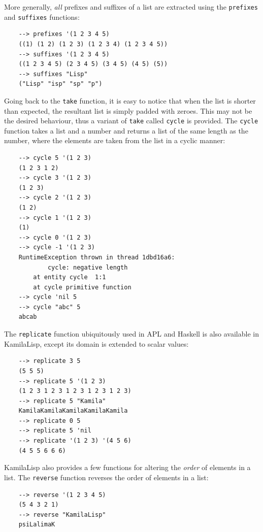More generally, \textit{all} prefixes and suffixes of a list are extracted using the \verb|prefixes| and \verb|suffixes| functions:

\begin{Verbatim}
    --> prefixes '(1 2 3 4 5)
    ((1) (1 2) (1 2 3) (1 2 3 4) (1 2 3 4 5))
    --> suffixes '(1 2 3 4 5)
    ((1 2 3 4 5) (2 3 4 5) (3 4 5) (4 5) (5))
    --> suffixes "Lisp"
    ("Lisp" "isp" "sp" "p")
\end{Verbatim}

Going back to the \verb|take| function, it is easy to notice that when the list is shorter than expected, the resultant list is simply padded with zeroes. This may not be the desired behaviour, thus a variant of \verb|take| called \verb|cycle| is provided. The \verb|cycle| function takes a list and a number and returns a list of the same length as the number, where the elements are taken from the list in a cyclic manner:

\begin{Verbatim}
    --> cycle 5 '(1 2 3)
    (1 2 3 1 2)
    --> cycle 3 '(1 2 3)
    (1 2 3)
    --> cycle 2 '(1 2 3)
    (1 2)
    --> cycle 1 '(1 2 3)
    (1)
    --> cycle 0 '(1 2 3)
    --> cycle -1 '(1 2 3)
    RuntimeException thrown in thread 1dbd16a6:
            cycle: negative length
        at entity cycle  1:1
        at cycle primitive function
    --> cycle 'nil 5
    --> cycle "abc" 5
    abcab
\end{Verbatim}

The \verb|replicate| function ubiquitously used in APL and Haskell is also available in KamilaLisp, except its domain is extended to scalar values:

\begin{Verbatim}
    --> replicate 3 5
    (5 5 5)
    --> replicate 5 '(1 2 3)
    (1 2 3 1 2 3 1 2 3 1 2 3 1 2 3)
    --> replicate 5 "Kamila"
    KamilaKamilaKamilaKamilaKamila
    --> replicate 0 5
    --> replicate 5 'nil
    --> replicate '(1 2 3) '(4 5 6)
    (4 5 5 6 6 6)
\end{Verbatim}

KamilaLisp also provides a few functions for altering the \textit{order} of elements in a list. The \verb|reverse| function reverses the order of elements in a list:

\begin{Verbatim}
    --> reverse '(1 2 3 4 5)
    (5 4 3 2 1)
    --> reverse "KamilaLisp"
    psiLalimaK
\end{Verbatim}

